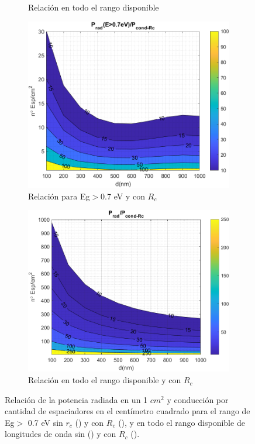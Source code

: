 \begin{figure}[H]
\begin{subfigure}[b]{0.49\textwidth}
		\caption{Relación en todo el rango disponible}
		\label{fig:rel_SiSiO2Si_full}
	\end{subfigure}
	\hfill
	\begin{subfigure}[b]{0.49\textwidth}
		\centering
		\includegraphics[width=1.00\textwidth]{figuras/Resultados/RelacionCondRad/SiSi_Rc.png}
		\caption{Relación para Eg$>$0.7 eV y con $R_c$}
		\label{fig:rel_SiSiO2Si_Rc}
	\end{subfigure}
	\hfill
	\begin{subfigure}[b]{0.49\textwidth}
		\centering
		\includegraphics[width=1.00\textwidth]{figuras/Resultados/RelacionCondRad/SiSi_Rc_full_10.png}
		\caption{Relación en todo el rango disponible y con $R_c$}
		\label{fig:rel_SiSiO2Si_Rc_full}
	\end{subfigure}
	\caption{Relación de la potencia radiada en un 1 $cm^2$ y conducción por cantidad de espaciadores en el centímetro cuadrado para el rango de Eg$>$ 0.7 eV sin $r_c$ () y con $R_c$ (), y en todo el rango disponible de longitudes de onda sin () y con $R_c$ ().}
	\label{fig:relation_SiSiO2Si}
\end{figure}
